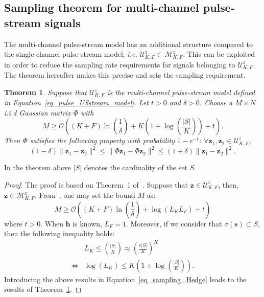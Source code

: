 \documentclass{article}
\newtheorem{theorem}{Theorem}
\newcommand{\ie}{\textit{i.e.}}
\newcommand{\vect}[1]{\bm{#1}}
\newcommand{\mat}[1]{\mathsf{#1}}
\theoremstyle{definition}
\begin{document}
\subsection{Sampling theorem for multi-channel pulse-stream signals}
\label{subsec_sampling_pulse_stream}
The multi-channel pulse-stream model has an additional structure compared to the single-channel pulse-stream model, \ie{} $\mathcal{U}^z_{K,F} \subset \mathcal{M}^z_{K,F}$. This can be exploited in order to reduce the sampling rate requirements for signals belonging to $\mathcal{U}^z_{K,F}$. The theorem hereafter makes this precise and sets the sampling requirement.
\begin{theorem}
	\label{th_stream_pulse_us}
	Suppose that $\mathcal{U}^z_{K,F}$ is the multi-channel pulse-stream model defined in Equation~\eqref{eq_pulse_USstream_model}. Let $t > 0$ and $\delta > 0$. Choose a $M \times N$ i.i.d Gaussian matrix $\mat{\Phi}$ with 
	\begin{equation*}
	M \geq \mathcal{O} \left(\left(K + F\right) \ln \left(\frac{1}{\delta} \right) + K \left( 1 + \log \left(\frac{|S|}{K}\right)\right) + t\right).
	\end{equation*} 
	Then $\mat{\Phi}$ satisfies the following property with probability $1-e^{-t}$: $\forall \vect{z}_1, \vect{z}_2 \in \mathcal{U}^z_{K,F}$, 
	\begin{equation*}
	\left(1- \delta\right) \| \vect{z}_1 - \vect{z}_2\|^2 \leq \| \mat{\Phi} \vect{z}_1 - \mat{\Phi} \vect{z}_2\|^2\leq \left(1+ \delta\right) \| \vect{z}_1 - \vect{z}_2\|^2.
	\end{equation*}
\end{theorem}
In the theorem above $|S|$ denotes the cardinality of the set $S$.
\begin{proof}
	The proof is based on Theorem~\num{1} of~\cite{Hedge_TSP_2011}. Suppose that $\vect{z} \in \mathcal{U}^z_{K,F}$, then, $\vect{z} \in \mathcal{M}^z_{K,F}$. From~\cite{Hedge_TSP_2011}, one may set the bound $M$ as:
	\begin{equation}
		\label{eq_sampling_Hedge}
		M \geq \mathcal{O} \left(\left(K + F\right) \ln \left(\frac{1}{\delta}\right) + \log \left(L_K L_F\right) + t\right)
	\end{equation} 
	where $t > 0$. When $\vect{h}$ is known, $L_F = 1$. Moreover, if we consider that $\sigma \left(\vect{s}\right) \subset S$, then the following inequality holds:
	\begin{align*}
		&L_K \leq {{|S|}\choose{K}} \approx \left(\frac{e|S|}{K}\right)^K \\
		\Leftrightarrow & \log \left(L_K\right) \leq K \left(1 + \log\left(\frac{|S|}{K}\right)\right).
	\end{align*}
	Introducing the above results in Equation~\eqref{eq_sampling_Hedge} leads to the results of Theorem~\ref{th_stream_pulse_us}.
\end{proof}
\end{document}
